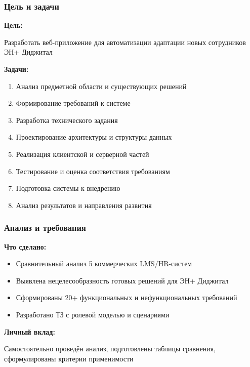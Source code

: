\documentclass{beamer}
\begin{document}
\begin{frame}
    \frametitle{Цель и задачи}
    
    \textbf{Цель:}
    
    Разработать веб-приложение для автоматизации адаптации новых сотрудников ЭН+ Диджитал
    
    \vspace{0.4cm}
    \textbf{Задачи:}
    \begin{enumerate}
        \item Анализ предметной области и существующих решений
        \item Формирование требований к системе
        \item Разработка технического задания
        \item Проектирование архитектуры и структуры данных
        \item Реализация клиентской и серверной частей
        \item Тестирование и оценка соответствия требованиям
        \item Подготовка системы к внедрению
        \item Анализ результатов и направления развития
    \end{enumerate}
\end{frame}

\begin{frame}
    \frametitle{Анализ и требования}
    
    \textbf{Что сделано:}
    \begin{itemize}
        \item Сравнительный анализ 5 коммерческих LMS/HR-систем
        \item Выявлена нецелесообразность готовых решений для ЭН+ Диджитал
        \item Сформированы 20+ функциональных и нефункциональных требований
        \item Разработано ТЗ с ролевой моделью и сценариями
    \end{itemize}
    
    \vspace{0.3cm}
    \textbf{Личный вклад:}
    
    Самостоятельно проведён анализ, подготовлены таблицы сравнения, сформулированы критерии применимости
\end{frame}
\end{document}
